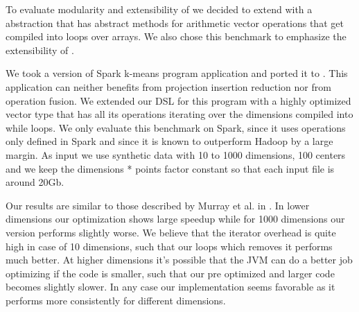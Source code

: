 To evaluate modularity and extensibility of \tool we decided to extend with a  abstraction that has abstract methods for arithmetic vector operations that get compiled into loops over arrays. We also chose this benchmark to emphasize the extensibility of \tool.

We took a version of Spark k-means program \cite{spark-nsdi} application and ported it to \tool. This application can neither benefits from projection insertion reduction nor from operation fusion. We extended our DSL for this program with a highly optimized vector type that has all its operations iterating over the dimensions compiled into while loops. We only evaluate this benchmark on Spark, since it uses operations only defined in Spark and since it is known to outperform Hadoop by a large margin. As input we use synthetic data with 10 to 1000 dimensions, 100 centers and we keep the dimensions * points factor constant so that each input file is around 20Gb.

Our results are similar to those described by Murray et al. in \cite{murray_steno:_2011}. In lower dimensions our optimization shows large speedup while for 1000 dimensions our version performs slightly worse. We believe that the iterator overhead is quite high in case of 10 dimensions, such that our loops which removes it performs much better. At higher dimensions it's possible that the JVM can do a better job optimizing if the code is smaller, such that our pre optimized and larger code becomes slightly slower. In any case our implementation seems favorable as it performs more consistently for different dimensions.

